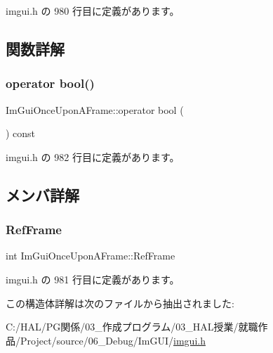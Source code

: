  imgui.\+h の 980 行目に定義があります。



\subsection{関数詳解}
\mbox{\label{struct_im_gui_once_upon_a_frame_a3c912b79bc333ce746356001431c2504}} 
\subsubsection{\texorpdfstring{operator bool()}{operator bool()}}
{\footnotesize\ttfamily Im\+Gui\+Once\+Upon\+A\+Frame\+::operator bool (\begin{DoxyParamCaption}{ }\end{DoxyParamCaption}) const\hspace{0.3cm}{\ttfamily [inline]}}



 imgui.\+h の 982 行目に定義があります。



\subsection{メンバ詳解}
\mbox{\label{struct_im_gui_once_upon_a_frame_a2d44776b8e7bdeec217f88be9f832e08}} 
\subsubsection{\texorpdfstring{Ref\+Frame}{RefFrame}}
{\footnotesize\ttfamily int Im\+Gui\+Once\+Upon\+A\+Frame\+::\+Ref\+Frame\hspace{0.3cm}{\ttfamily [mutable]}}



 imgui.\+h の 981 行目に定義があります。



この構造体詳解は次のファイルから抽出されました\+:\begin{DoxyCompactItemize}
\item 
C\+:/\+H\+A\+L/\+P\+G関係/03\+\_\+作成プログラム/03\+\_\+\+H\+A\+L授業/就職作品/\+Project/source/06\+\_\+\+Debug/\+Im\+G\+U\+I/\mbox{\hyperlink{imgui_8h}{imgui.\+h}}\end{DoxyCompactItemize}
